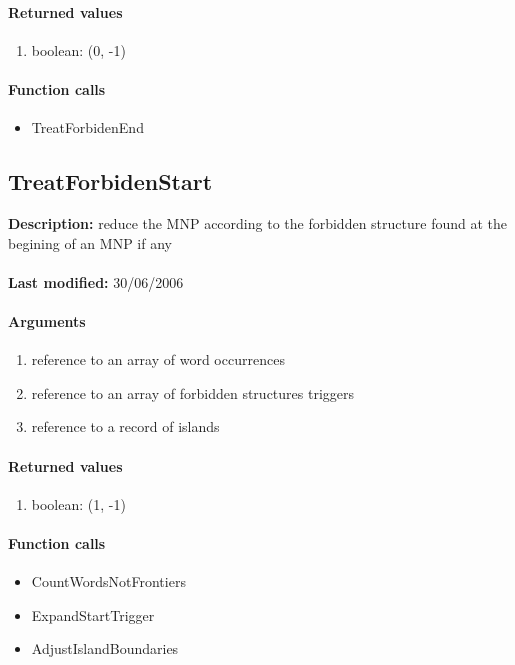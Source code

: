 \paragraph{Returned values}
\begin{enumerate}
\item boolean: (0, -1)
\end{enumerate}

\paragraph{Function calls}
\begin{itemize}
\item TreatForbidenEnd
\end{itemize}

\subsection{TreatForbidenStart}
\textbf{Description:} reduce the MNP according to the forbidden structure found at the begining of an MNP if any\\
\\\textbf{Last modified:} 30/06/2006

\paragraph{Arguments}
\begin{enumerate}
\item reference to an array of word occurrences
\item reference to an array of forbidden structures triggers
\item reference to a record of islands
\end{enumerate}

\paragraph{Returned values}
\begin{enumerate}
\item boolean: (1, -1)
\end{enumerate}

\paragraph{Function calls}
\begin{itemize}
\item CountWordsNotFrontiers
\item ExpandStartTrigger
\item AdjustIslandBoundaries
\end{itemize}

